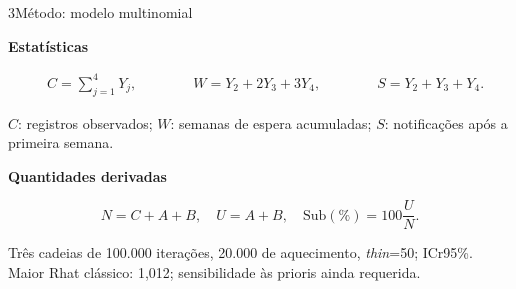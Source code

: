 \documentclass{rbras-poster}
\newcommand{\eqPosterPeq}{\fontsize{23bp}{29bp}\selectfont}
\newcommand{\textoMetodo}{\fontsize{21bp}{26bp}\selectfont}
\begin{document}
\begin{colunaesquerda}
\begin{secao}{3}{Método: modelo multinomial}
\vspace{20pt}
{\tamRotulo\bfseries Estatísticas\par}
\begin{caixametodo}
{\eqPosterPeq
\begin{equation*}
\begin{aligned}
&C=\sum_{j=1}^{4}Y_j, \quad \quad \quad \quad
W=Y_2+2Y_3+3Y_4, \quad \quad \quad \quad
S=Y_2+Y_3+Y_4.
\end{aligned}
\end{equation*}}
\end{caixametodo}
{\textoMetodo $C$: registros observados; $W$: semanas de
espera acumuladas; $S$: notificações após a primeira semana.\par}
{\tamRotulo\bfseries Quantidades derivadas\par}
\begin{caixametodo}
{\eqPosterPeq
\begin{equation*}
N=C+A+B,\quad U=A+B,\quad \mathrm{Sub}(\%)=100\frac{U}{N}.
\end{equation*}}
\end{caixametodo}
{\textoMetodo Três cadeias de 100.000 iterações,
20.000 de aquecimento, \textit{thin}=50; ICr95\%.
Maior Rhat clássico: 1,012; sensibilidade às prioris ainda requerida.\par}
\end{secao}
\end{colunaesquerda}
\end{document}
